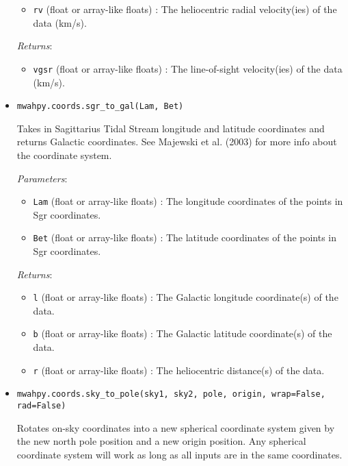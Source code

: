 \documentclass{article}
\begin{document}
\begin{itemize}
\begin{itemize}
\item \verb!rv! (float or array-like floats) : The heliocentric radial velocity(ies) of the data (km/s).

\end{itemize}

\textit{Returns}: \begin{itemize}

\item \verb!vgsr! (float or array-like floats) : The line-of-sight velocity(ies) of the data (km/s).

\end{itemize}



\item \verb!mwahpy.coords.sgr_to_gal(Lam, Bet)!

Takes in Sagittarius Tidal Stream longitude and latitude coordinates and returns Galactic coordinates. See Majewski et al. (2003) for more info about the coordinate system. 

\textit{Parameters}: \begin{itemize}

\item \verb!Lam! (float or array-like floats) : The longitude coordinates of the points in Sgr coordinates.

\item \verb!Bet! (float or array-like floats) : The latitude coordinates of the points in Sgr coordinates.

\end{itemize}

\textit{Returns}: \begin{itemize}

\item \verb!l! (float or array-like floats) : The Galactic longitude coordinate(s) of the data.

\item \verb!b! (float or array-like floats) : The Galactic latitude coordinate(s) of the data.

\item \verb!r! (float or array-like floats) : The heliocentric distance(s) of the data.

\end{itemize}



\item \verb!mwahpy.coords.sky_to_pole(sky1, sky2, pole, origin, wrap=False, rad=False)!

Rotates on-sky coordinates into a new spherical coordinate system given by the new north pole position and a new origin position. Any spherical coordinate system will work as long as all inputs are in the same coordinates. \


\end{itemize}
\end{document}
